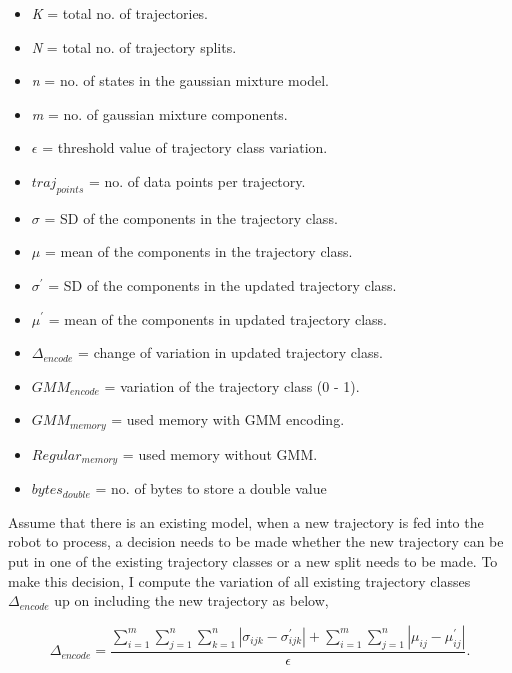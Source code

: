 \documentclass[conference]{IEEEtran}
\begin{document}
\begin {itemize}
\item[]{\textit{K} = total no. of trajectories.}
\item[]{\textit{N} = total no. of trajectory splits.}
\item[]{\textit{n} = no. of states in the gaussian mixture model.}
\item[]{\textit{m} = no. of gaussian mixture components.}
\item[]{\textit{$\epsilon$} = threshold value of trajectory class variation.}
\item[]{\textit{$traj_{points}$} = no. of data points per trajectory.} 
\item[]{\textit{$\sigma$} = SD of the components in the trajectory class.} 
\item[]{\textit{$\mu$} = mean of the components in the trajectory class.} 
\item[]{\textit{$\sigma^\prime$} = SD of the components in the updated trajectory class.} 
\item[]{\textit{$\mu^\prime$} = mean of the components in updated trajectory class.} 
\item[]{\textit{$\Delta_{encode}$} = change of variation in updated trajectory class.} 
\item[]{\textit{$GMM_{encode}$} = variation of the trajectory class (0 - 1).} 
\item[]{\textit{$GMM_{memory}$} = used memory with GMM encoding.} 
\item[]{\textit{$Regular_{memory}$} = used memory without GMM.} 
\item[]{\textit{$bytes_{double}$} = no. of bytes to store a double value} 
\end {itemize}

Assume that there is an existing model, when a new trajectory is fed into the robot to process, a decision needs to be made whether the new trajectory can be put in one of the existing trajectory classes or a new split needs to be made. To make this decision, I compute the variation of all existing trajectory classes $\Delta_{encode}$ up on including the new trajectory as below,

\begin{equation}
\Delta_{encode} = \frac{\sum_{i=1}^m \sum_{j=1}^n \sum_{k=1}^n |\sigma_{ijk} - \sigma_{ijk}^\prime| + \sum_{i=1}^m \sum_{j=1}^n |\mu_{ij} - \mu_{ij}^\prime|}{\epsilon}.
\end{equation}
\end{document}

